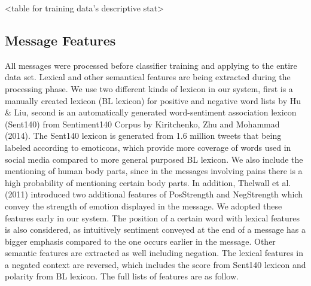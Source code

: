 \documentclass{llncs}
\begin{document}
{{<table for training data’s descriptive stat>}}

\subsection{Message Features}

All messages were processed before classifier training and applying to the entire data set. Lexical and other semantical features are being extracted during the processing phase. We use two different kinds of lexicon in our system, first is a manually created lexicon (BL lexicon) for positive and negative word lists by Hu \& Liu\cite{Hu2004}, second is an automatically generated word-sentiment association lexicon (Sent140) from Sentiment140 Corpus\cite{go2009twitter} by Kiritchenko, Zhu and Mohammad (2014)\cite{Kiritchenko2014}. The Sent140 lexicon is generated from 1.6 million tweets that being labeled according to emoticons, which provide more coverage of words used in social media compared to more general purposed BL lexicon\cite{Kiritchenko2014}. We also include the mentioning of human body parts, since in the messages involving pains there is a high probability of mentioning certain body parts. In addition, Thelwall et al. (2011) introduced two additional features of PosStrength and NegStrength which convey the strength of emotion displayed in the message\cite{Thelwall2010}. We adopted these features early in our system. The position of a certain word with lexical features is also considered, as intuitively sentiment conveyed at the end of a message has a bigger emphasis compared to the one occurs earlier in the message.\cite{Pang2002} Other semantic features are extracted as well including negation. The lexical features in a negated context are reversed\cite{Taboada2011}, which includes the score from Sent140 lexicon and polarity from BL lexicon. The full lists of features are as follow.
\end{document}
